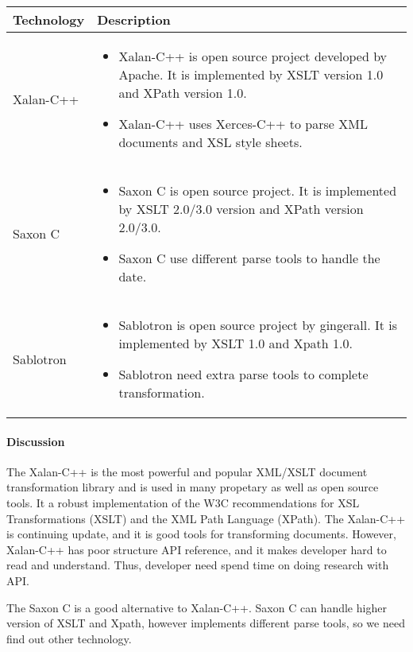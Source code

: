 \begin{center}
    \begin{tabular}{ | l | p{10cm} |}
    \hline
    Technology & Description  \\ \hline
    Xalan-C++ \cite{xalan} &
    \begin{itemize}
      \item Xalan-C++ is open source project developed by Apache. It is implemented by XSLT version 1.0 and XPath version 1.0.
      \item Xalan-C++ uses Xerces-C++ to parse XML documents and XSL style sheets.
    \end{itemize}\\ \hline
    Saxon C \cite{Saxon_c} &
    \begin{itemize}
      \item Saxon C is open source project. It is implemented by XSLT 2.0/3.0 version and XPath version 2.0/3.0.
      \item Saxon C use different parse tools to handle the date.
    \end{itemize}\\ \hline
    Sablotron \cite{Sablotron_intro} &
    \begin{itemize}
      \item Sablotron is open source project by gingerall. It is implemented by XSLT 1.0 and Xpath 1.0.
	  \item Sablotron need extra parse tools to complete transformation.
    \end{itemize}\\ \hline
    \end{tabular}
\end{center}

\paragraph{Discussion}

The Xalan-C++ is the most powerful and popular XML/XSLT document transformation library and is used in many propetary as well as open source tools.
It a robust implementation of the W3C recommendations for XSL Transformations (XSLT) and the XML Path Language (XPath).
The Xalan-C++ is continuing update, and it is good tools for transforming documents.
However, Xalan-C++ has poor structure API reference, and it makes developer hard to read and understand.
Thus, developer need spend time on doing research with API.

The Saxon C is a good alternative to Xalan-C++.
Saxon C can handle higher version of XSLT and Xpath, however implements different parse tools, so we need find out other technology.

